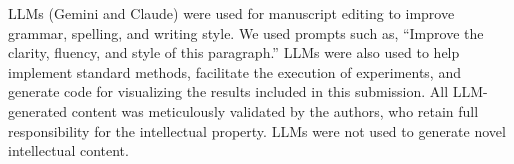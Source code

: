 

LLMs (Gemini and Claude) were used for manuscript editing to improve grammar, spelling, and writing style. We used prompts such as, ``Improve the clarity, fluency, and style of this paragraph.'' LLMs were also used to help implement standard methods, facilitate the execution of experiments, and generate code for visualizing the results included in this submission. All LLM-generated content was meticulously validated by the authors, who retain full responsibility for the intellectual property. LLMs were not used to generate novel intellectual content.